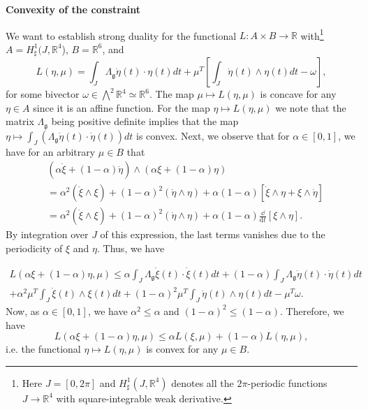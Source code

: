 \documentclass[10pt,a4paper]{article}
\author{Philipp Weder}
\date{}
\theoremstyle{plain}
\theoremstyle{plain}
\theoremstyle{plain}
\theoremstyle{remark}
\theoremstyle{definition}
\theoremstyle{definition}
\theoremstyle{plain}
\theoremstyle{plain}
\newcommand{\R}{\mathbb{R}}
\newcommand{\dd}[1]{\mathrm{d}#1}
\begin{document}
\thispagestyle{plain}
\begin{center}
\begin{Large}
\textbf{Convexity of the constraint}\\
\end{Large}
\end{center}
We want to establish strong duality for the functional $L: A \times B \to \R$ with\footnote{Here $J = [0, 2 \pi]$ and $H^1_{\sharp}(J, \R^4)$ denotes all the $2\pi$-periodic functions $J \to \R^4$ with square-integrable weak derivative.} $A = H^{1}_{\sharp}(J, \R^4$), $B = \R^6$, and
\begin{equation}
L(\eta, \mu) = \int_{J} \Lambda_{\mathfrak{g}} \dot{\eta}(t) \cdot \eta(t) dt + \mu^T \left [ \int_{J} \dot{\eta}(t) \wedge \eta(t) dt - \omega \right ],
\end{equation}
for some bivector $\omega \in \bigwedge^2 \R^4 \simeq \R^6$. The map $\mu \mapsto L(\eta, \mu)$ is concave for any $\eta \in A$ since it is an affine function. For the map $\eta \mapsto L(\eta, \mu)$ we note that the matrix $\Lambda_{\mathfrak{g}}$ being positive definite implies that the map $\eta \mapsto \int_{J}( \Lambda_{\mathfrak{g}} \dot{\eta} (t)\cdot \dot{\eta}(t) )dt$ is convex. Next, we observe that for $\alpha \in [0,1]$, we have for an arbitrary $\mu \in B$ that
\begin{align}
&( \alpha \dot{\xi} + (1 -  \alpha) \dot{\eta}) \wedge ( \alpha \xi + (1 -  \alpha) \eta)\nonumber \\
&= \alpha^2(\dot{\xi} \wedge \xi) + (1 - \alpha)^2 (\dot{\eta} \wedge \eta) + \alpha(1- \alpha) [\dot{\xi} \wedge \eta + \xi \wedge \dot{\eta}]\\
&= \alpha^2(\dot{\xi} \wedge \xi) + (1 - \alpha)^2 (\dot{\eta} \wedge \eta) + \alpha(1- \alpha) \tfrac{\dd }{\dd t} [\xi \wedge \eta].
\end{align}
By integration over $J$ of this expression, the last terms vanishes due to the periodicity of $\xi$ and $\eta$. Thus, we have

\begin{align}
L(\alpha \xi + (1 - \alpha) \eta, \mu) \leq \alpha \int_J \Lambda_{\mathfrak{g}} \dot{\xi}(t) \cdot \dot{\xi}(t) dt + (1-\alpha)  \int_J \Lambda_{\mathfrak{g}} \dot{\eta}(t) \cdot \dot{\eta}(t) dt \nonumber \\
 + \alpha^2 \mu^T \int_J \dot{\xi}(t) \wedge \xi(t) dt + (1 - \alpha)^2  \mu^T \int_J \dot{\eta}(t) \wedge \eta(t) dt - \mu^T \omega.
\end{align}
Now, as $\alpha \in [0,1]$, we have $\alpha^2 \leq \alpha$ and $(1-\alpha)^2 \leq (1- \alpha)$. Therefore, we have
\begin{equation}
L(\alpha \xi + (1 - \alpha) \eta, \mu) \leq \alpha L(\xi, \mu) + (1 - \alpha) L(\eta, \mu),
\end{equation}
i.e. the functional $\eta \mapsto L(\eta, \mu)$ is convex for any $\mu \in B$.
\end{document}
